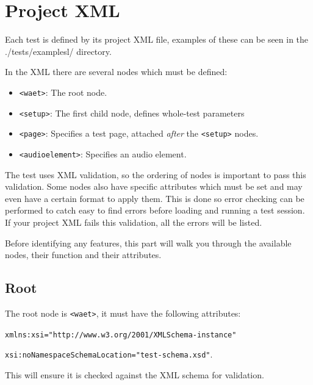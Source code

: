 \documentclass[11pt, oneside]{article}   	%
\begin{document}
	
\clearpage

\section{Project XML}

    Each test is defined by its project XML file, examples of these can be seen in the ./tests/examplesl/ directory.
    
    In the XML there are several nodes which must be defined:
	\begin{itemize}
	    \item \texttt{<waet>}: The root node.
	    \item \texttt{<setup>}: The first child node, defines whole-test parameters
	    \item \texttt{<page>}: Specifies a test page, attached \emph{after} the \texttt{<setup>} nodes.
	    \item \texttt{<audioelement>}: Specifies an audio element.
	\end{itemize}

    The test uses XML validation, so the ordering of nodes is important to pass this validation. Some nodes also have specific attributes which must be set and may even have a certain format to apply them. This is done so error checking can be performed to catch easy to find errors before loading and running a test session. If your project XML fails this validation, all the errors will be listed.
    
    Before identifying any features, this part will walk you through the available nodes, their function and their attributes.
    
    \subsection{Root}
        The root node is \texttt{<waet>}, it must have the following attributes:
        
        \texttt{xmlns:xsi="http://www.w3.org/2001/XMLSchema-instance"}
        
        \texttt{xsi:noNamespaceSchemaLocation="test-schema.xsd"}.
        
        This will ensure it is checked against the XML schema for validation.
\end{document}
